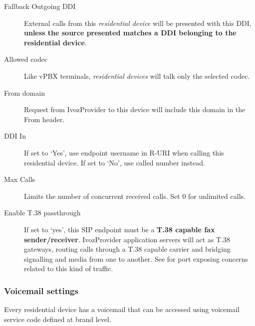 \documentclass[letterpaper,10pt,english]{sphinxmanual}
\begin{document}
\begin{description}
\item[{Fallback Outgoing DDI}] \leavevmode{}\label{administration_portal/client/residential/residential_devices:term-fallback-outgoing-ddi}
External calls from this \emph{residential device} will be presented with this DDI, \textbf{unless
the source presented matches a DDI belonging to the residential device}.

\item[{Allowed codec}] \leavevmode{}\label{administration_portal/client/residential/residential_devices:term-allowed-codec}
Like vPBX terminals, \emph{residential devices} will talk only the selected codec.

\item[{From domain}] \leavevmode{}\label{administration_portal/client/residential/residential_devices:term-from-domain}
Request from IvozProvider to this device will include this domain in
the From header.

\item[{DDI In}] \leavevmode{}\label{administration_portal/client/residential/residential_devices:term-ddi-in}
If set to `Yes', use endpoint username in R-URI when calling this residential device. If set to `No', use called
number instead.

\item[{Max Calls}] \leavevmode{}\label{administration_portal/client/residential/residential_devices:term-max-calls}
Limits the number of concurrent received calls. Set 0 for unlimited calls.

\item[{Enable T.38 passthrough}] \leavevmode{}\label{administration_portal/client/residential/residential_devices:term-enable-t-38-passthrough}
If set to `yes', this SIP endpoint must be a \textbf{T.38 capable fax sender/receiver}. IvozProvider
application servers will act as T.38 gateways, routing calls through a T.38 capable carrier and
bridging signalling and media from one to another. See {\hyperref[security_and_maintenance/security/firewall:firewall]{}} for port exposing concerns
related to this kind of traffic.

\end{description}


\subsubsection{Voicemail settings}
\label{administration_portal/client/residential/residential_devices:voicemail-settings}
Every residential device has a voicemail that can be accessed using voicemail service code defined at brand level.
\end{document}
